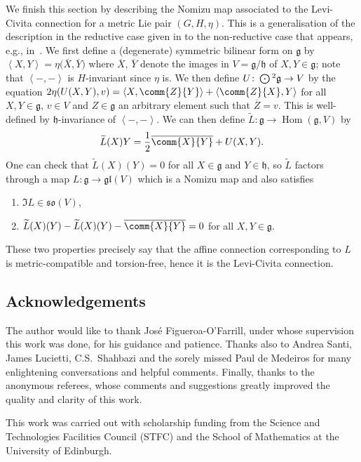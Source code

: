 \documentclass[pdftex]{sigma}
\numberwithin{equation}{section}
\newcommand{\fg}{\mathfrak{g}}
\newcommand{\fh}{\mathfrak{h}}
\newcommand{\fgl}{\mathfrak{gl}}
\newcommand{\fso}{\mathfrak{so}}
\newcommand{\Odot}{\mathchoice{{\textstyle\bigodot}}{\bigodot}{\bigodot}{\bigodot}}
\newcommand{\1}{\mathbbm{1}}
\newcommand{\pair}[2]{\left\langle #1,#2\right\rangle} %
\DeclareMathOperator{\Hom}{Hom}
\begin{document}
We finish this section by describing the Nomizu map associated to the Levi-Civita connection for a metric Lie pair $(G,H,\eta)$. This is a generalisation of the description in the reductive case given in \cite{Nomizu1969} to the non-reductive case that appears, e.g., in~\cite{Figueroa-OFarrill2017_1}. We first define a (degenerate) symmetric bilinear form on $\fg$ by $\pair{X}{Y}=\eta\bigl(\overline{X},\overline{Y}\bigr)$ where $\overline{X}$, $\overline{Y}$ denote the images in $V=\fg/\fh$ of $X,Y\in\fg$; note that $\pair{-}{-}$ is $H$-invariant since $\eta$ is. We then define $U\colon \Odot^2\fg\to V$ by the equation
$2\eta(U(X,Y),v) = \pair{X}{\comm{Z}{Y}} + \pair{\comm{Z}{X}}{Y}
$
for all $X,Y\in\fg$, $v\in V$ and $Z\in\fg$ an arbitrary element such that $\overline{Z}=v$. This is well-defined by $\fh$-invariance of $\pair{-}{-}$. We can then define $\widetilde{L}\colon \fg\to\Hom(\fg,V)$ by
\[
	\widetilde{L}(X)Y = \frac{1}{2}\overline{\comm{X}{Y}} + U(X,Y).
\]
One can check that $\widetilde{L}(X)(Y)=0$ for all $X\in\fg$ and $Y\in\fh$, so $\widetilde{L}$ factors through a map $L\colon \fg\to\fgl(V)$ which is a Nomizu map and also satisfies
\begin{enumerate}\itemsep=0pt
	\item $\Im L\in\fso(V)$,
	\item $\widetilde{L}(X)(Y) - \widetilde{L}(X)(Y) - \overline{\comm{X}{Y}} = 0$ for all $X,Y\in \fg$.
\end{enumerate}
These two properties precisely say that the affine connection corresponding to $L$ is metric-compatible and torsion-free, hence it is the Levi-Civita connection.

\subsection*{Acknowledgements}

The author would like to thank Jos\'e Figueroa-O'Farrill, under whose supervision this work was done, for his guidance and patience. Thanks also to Andrea Santi, James Lucietti, C.S.~Shahbazi and the sorely missed Paul de Medeiros for many enlightening conversations and helpful comments. Finally, thanks to the anonymous referees, whose comments and suggestions greatly improved the quality and clarity of this work.

This work was carried out with scholarship funding from the Science and Technologies Facilities Council (STFC) and the School of Mathematics at the University of Edinburgh.
\end{document}
